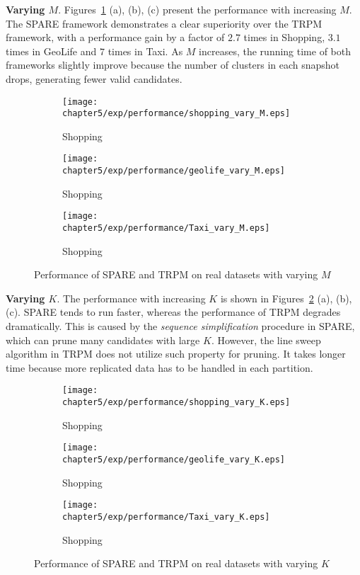 \textbf{Varying $M$}. Figures~\ref{exp:performance_vary_m} (a), (b), (c)
present the performance with increasing $M$. The SPARE framework demonstrates a clear superiority over the TRPM framework, with 
a performance gain by a factor of  $2.7$ times in Shopping, $3.1$ times in GeoLife and
$7$ times in Taxi. As $M$ increases, the running time of both frameworks slightly improve because the number of clusters in each snapshot drops, generating fewer valid candidates.

\begin{figure}[h]
\centering
    \begin{subfigure}[b]{0.3\textwidth}
        \texttt{[image: chapter5/exp/performance/shopping\_vary\_M.eps]}
	     \caption{Shopping}	
    \end{subfigure}
    \begin{subfigure}[b]{0.3\textwidth}
        \texttt{[image: chapter5/exp/performance/geolife\_vary\_M.eps]}
	     \caption{Shopping}	
    \end{subfigure}
    \begin{subfigure}[b]{0.3\textwidth}
        \texttt{[image: chapter5/exp/performance/Taxi\_vary\_M.eps]}
	     \caption{Shopping}	
    \end{subfigure}
\caption{Performance of SPARE and TRPM on real datasets with varying $M$}
\label{exp:performance_vary_m}
\end{figure}



\textbf{Varying $K$}. The performance with increasing $K$ is shown in Figures~\ref{exp:performance_vary_k} (a), (b), (c).  SPARE tends to run faster, whereas the performance of TRPM degrades dramatically. This is caused by the \emph{sequence simplification} procedure in SPARE, which can prune many candidates with large $K$. However, the line sweep algorithm in TRPM does not utilize such property for pruning. It takes longer time because more replicated data has to be handled in each partition.

\begin{figure}[h]
\centering
    \begin{subfigure}[b]{0.3\textwidth}
        \texttt{[image: chapter5/exp/performance/shopping\_vary\_K.eps]}
	     \caption{Shopping}	
    \end{subfigure}
    \begin{subfigure}[b]{0.3\textwidth}
        \texttt{[image: chapter5/exp/performance/geolife\_vary\_K.eps]}
	     \caption{Shopping}	
    \end{subfigure}
    \begin{subfigure}[b]{0.3\textwidth}
        \texttt{[image: chapter5/exp/performance/Taxi\_vary\_K.eps]}
	     \caption{Shopping}	
    \end{subfigure}
\caption{Performance of SPARE and TRPM on real datasets with varying $K$}
\label{exp:performance_vary_k}
\end{figure}


